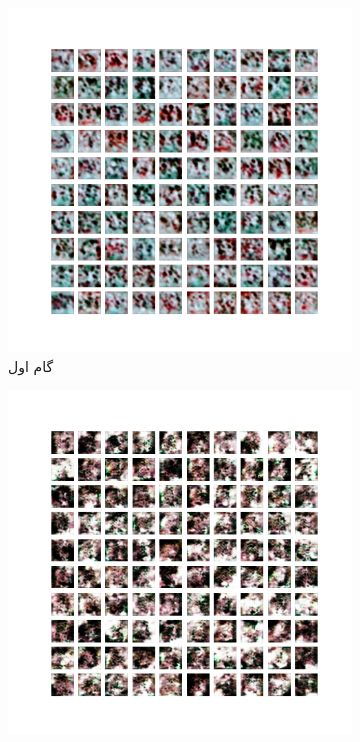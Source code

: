 \documentclass[12pt, a4paper]{book}
\begin{document}
\begin{figure}[h]
    \begin{subfigure}{0.3\linewidth}
        \includegraphics[width=\linewidth]{images/dcgan/noisy_std2.0/generated_img_01.png}
        \caption{گام اول}
    \end{subfigure}
    \begin{subfigure}{0.3\linewidth}
        \includegraphics[width=\linewidth]{images/dcgan/noisy_std2.0/generated_img_15.png}

\end{subfigure}
\end{figure}
\end{document}

